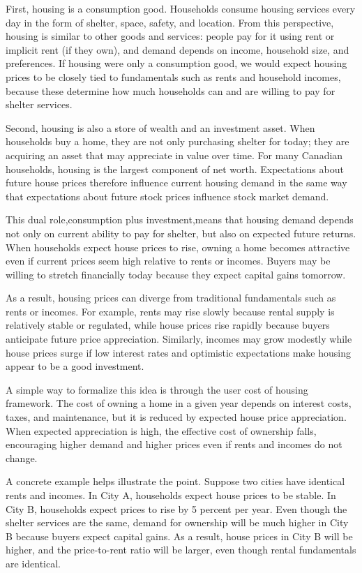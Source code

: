 \documentclass[11pt]{article}
\begin{document}
First, housing is a consumption good. Households consume housing services every day in the form of shelter, space, safety, and location. From this perspective, housing is similar to other goods and services: people pay for it using rent or implicit rent (if they own), and demand depends on income, household size, and preferences. If housing were only a consumption good, we would expect housing prices to be closely tied to fundamentals such as rents and household incomes, because these determine how much households can and are willing to pay for shelter services.

Second, housing is also a store of wealth and an investment asset. When households buy a home, they are not only purchasing shelter for today; they are acquiring an asset that may appreciate in value over time. For many Canadian households, housing is the largest component of net worth. Expectations about future house prices therefore influence current housing demand in the same way that expectations about future stock prices influence stock market demand.

This dual role,consumption plus investment,means that housing demand depends not only on current ability to pay for shelter, but also on expected future returns. When households expect house prices to rise, owning a home becomes attractive even if current prices seem high relative to rents or incomes. Buyers may be willing to stretch financially today because they expect capital gains tomorrow.

As a result, housing prices can diverge from traditional fundamentals such as rents or incomes. For example, rents may rise slowly because rental supply is relatively stable or regulated, while house prices rise rapidly because buyers anticipate future price appreciation. Similarly, incomes may grow modestly while house prices surge if low interest rates and optimistic expectations make housing appear to be a good investment.

A simple way to formalize this idea is through the user cost of housing framework. The cost of owning a home in a given year depends on interest costs, taxes, and maintenance, but it is reduced by expected house price appreciation. When expected appreciation is high, the effective cost of ownership falls, encouraging higher demand and higher prices even if rents and incomes do not change.

A concrete example helps illustrate the point. Suppose two cities have identical rents and incomes. In City A, households expect house prices to be stable. In City B, households expect prices to rise by 5 percent per year. Even though the shelter services are the same, demand for ownership will be much higher in City B because buyers expect capital gains. As a result, house prices in City B will be higher, and the price-to-rent ratio will be larger, even though rental fundamentals are identical.
\end{document}
